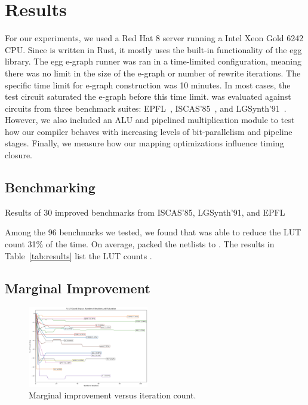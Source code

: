 \section{Results}\label{sec:results}
For our experiments, we used a Red Hat 8 server running a Intel Xeon Gold 6242
CPU. Since \shortname{} is written in Rust, it mostly uses the built-in
functionality of the egg library. The egg e-graph runner was ran in a
time-limited configuration, meaning there was no limit in the size of the
e-graph or number of rewrite iterations. The specific time limit for e-graph
construction was 10 minutes. In most cases, the test circuit saturated the
e-graph before this time limit. \shortname{} was evaluated against circuits
from three benchmark suites: EPFL~\cite{epflbench}, ISCAS'85~\cite{iscasbench},
and LGSynth'91~\cite{lgsynthbench}. However, we also included an ALU and
pipelined multiplication module to test how our compiler behaves with
increasing levels of bit-parallelism and pipeline stages. Finally, we measure
how our mapping optimizations influence timing closure.

\subsection{Benchmarking}\label{sec:results:benchmark}
\begin{table}
    \centering
    \caption{Results of 30 improved benchmarks from ISCAS'85, LGSynth'91, and EPFL}\label{tab:results}
\end{table}
Among the 96 benchmarks we tested, we found that \shortname{} was able to
reduce the LUT count 31\% of the time. On average, \shortname{} packed the
netlists to \metric{}. The results in Table~\ref{tab:results} list the LUT counts .

\subsection{Marginal Improvement}\label{sec:results:margin}
\begin{figure}
    \centering
    \includegraphics[width=0.47\textwidth]{img/improvement.png}
    \caption{Marginal improvement versus iteration count.}\label{fig:improvement}
    \Description[]{}
\end{figure}

